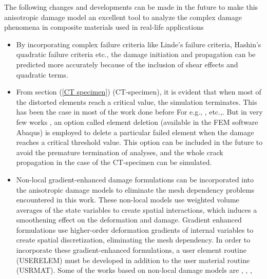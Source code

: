 \documentclass[12pt,a4paper,twoside,openright]{report}
\begin{document}
The following changes and developments can be made in the future to make this anisotropic damage model an excellent tool to analyze the complex damage phenomena in composite materials used in real-life applications
\begin{itemize}
\item By incorporating complex failure criteria like Linde's failure criteria, Hashin's quadratic failure criteria \citep{jiang2018evaluations} etc., the damage initiation and propagation can be predicted more accurately because of the inclusion of shear effects and quadratic terms.

\item From section (\ref{CT specimen}) (CT-specimen), it is evident that when most of the distorted elements reach a critical value, the simulation terminates. This has been the case in most of the work done before For e.g., \citep{lapczyk2007progressive}, \citep{el2015efficient} etc.,. But in very few works \citep{jiang2018evaluations}, \citep{sokolinsky2011numerical} an option called element deletion (available in the FEM software Abaqus) is employed to delete a particular failed element when the damage reaches a critical threshold value. This option can be included in the future to avoid the premature termination of analyses, and the whole crack propagation in the case of the CT-specimen can be simulated. 

\item Non-local gradient-enhanced damage formulations can be incorporated into the anisotropic damage models to eliminate the mesh dependency problems encountered in this work.  These non-local models use weighted volume averages of the state variables to create spatial interactions, which induces a smoothening effect on the deformation and damage.  Gradient enhanced formulations use higher-order deformation gradients of internal variables to create spatial discretization, eliminating the mesh dependency. In order to incorporate these gradient-enhanced formulations, a user element routine (USERELEM) must be developed in addition to the user material routine (USRMAT).   Some of the works based on non-local damage models are \citep{peerlings1999enhanced}, \citep{fassin2019gradient}, \citep{geers1998experimental}, \citep{seupel2018efficient}


\end{itemize}





\newpage
{} 


\end{document}
